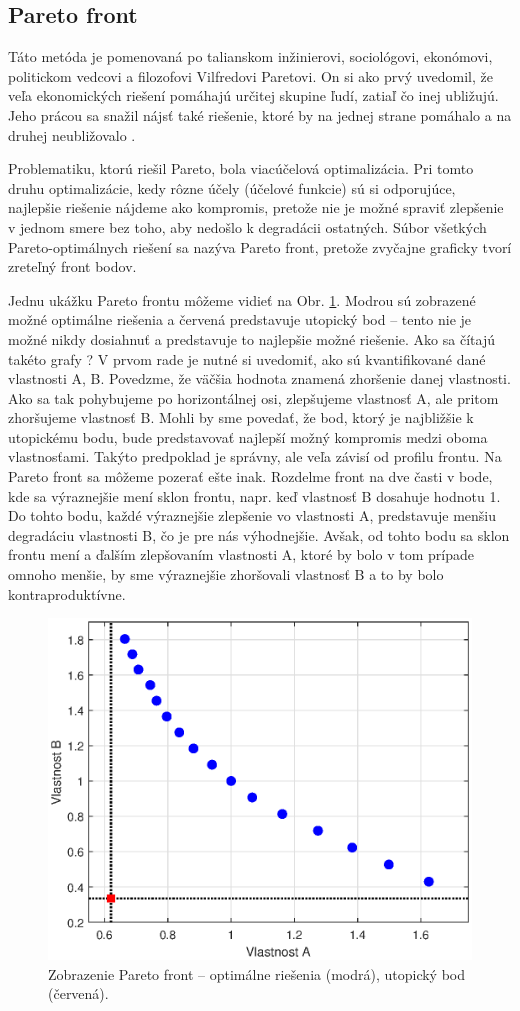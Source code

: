 \subsection{Pareto front}
Táto metóda je pomenovaná po talianskom inžinierovi, sociológovi, ekonómovi, politickom vedcovi a filozofovi Vilfredovi Paretovi. On si ako prvý uvedomil, že veľa ekonomických riešení pomáhajú určitej skupine ľudí, zatiaľ čo inej ubližujú. Jeho prácou sa snažil nájsť také riešenie, ktoré  by na jednej strane pomáhalo a na druhej neubližovalo \cite{mornati:pareto_opt:2013}. 

Problematiku, ktorú riešil Pareto, bola viacúčelová optimalizácia. Pri tomto druhu optimalizácie, kedy rôzne účely (účelové funkcie) sú si odporujúce, najlepšie riešenie nájdeme ako kompromis, pretože nie je možné spraviť zlepšenie v jednom smere bez toho, aby nedošlo k degradácii ostatných. Súbor všetkých Pareto-optimálnych riešení sa nazýva Pareto front, pretože zvyčajne graficky tvorí zreteľný front bodov.

Jednu ukážku Pareto frontu môžeme vidieť na Obr. \ref{fig:Pareto_example}. Modrou sú zobrazené možné optimálne riešenia a červená predstavuje utopický bod -- tento nie je možné nikdy dosiahnuť a predstavuje to najlepšie možné riešenie. Ako sa čítajú takéto grafy ? V prvom rade je nutné si uvedomiť, ako sú kvantifikované dané vlastnosti A, B. Povedzme, že väčšia hodnota znamená zhoršenie danej vlastnosti. Ako sa tak pohybujeme po horizontálnej osi, zlepšujeme vlastnosť A, ale pritom zhoršujeme vlastnosť B. Mohli by sme povedať, že bod, ktorý je najbližšie k utopickému bodu, bude predstavovať najlepší možný kompromis medzi oboma vlastnosťami. Takýto predpoklad je správny, ale veľa závisí od profilu frontu. Na Pareto front sa môžeme pozerať ešte inak. 
Rozdelme front na dve časti v bode, kde sa výraznejšie mení sklon frontu, napr. keď vlastnosť B dosahuje hodnotu 1. Do tohto bodu, každé výraznejšie zlepšenie vo vlastnosti A, predstavuje menšiu degradáciu vlastnosti B, čo je pre nás výhodnejšie. Avšak, od tohto bodu sa sklon frontu mení a ďalším zlepšovaním vlastnosti A, ktoré by bolo v tom prípade omnoho menšie, by sme výraznejšie zhoršovali vlastnosť B a to by bolo kontraproduktívne.

\begin{figure}
	\centering
	\includegraphics[width=0.7\linewidth]{images/Pareto_ex}
	\caption{Zobrazenie Pareto front -- optimálne riešenia (modrá), utopický bod (červená).}
	\label{fig:Pareto_example}
\end{figure}


